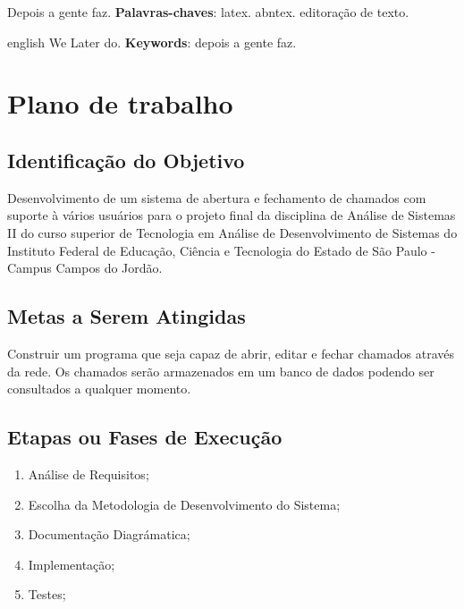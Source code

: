 \documentclass[12pt,openright,a4paper, article]{abntex2}
\begin{document}
\imprimircapa
\imprimirfolhaderosto

\tableofcontents

\newpage

\begin{resumo}
    Depois a gente faz.
    \vspace{\onelineskip}
    \noindent
    \textbf{Palavras-chaves}: latex. abntex. editoração de texto.
\end{resumo}

\begin{resumo}[abstract]
    \begin{otherlanguage*}{english}
        We Later do.
        \vspace{\onelineskip}
        \noindent
        \textbf{Keywords}: depois a gente faz.
    \end{otherlanguage*}
\end{resumo}

\textual

\section {Plano de trabalho}

    \subsection {Identificação do Objetivo}
    Desenvolvimento de um sistema de abertura e fechamento de chamados com suporte à vários usuários para o projeto final da disciplina de Análise de Sistemas II do curso superior de Tecnologia em Análise de Desenvolvimento de Sistemas do Instituto Federal de Educação, Ciência e Tecnologia do Estado de São Paulo - Campus Campos do Jordão.
    
    \subsection {Metas a Serem Atingidas}
        Construir um programa que seja capaz de abrir, editar e fechar chamados através da rede. Os chamados serão armazenados em um banco de dados podendo ser consultados a qualquer momento.
    
    \subsection {Etapas ou Fases de Execução}
        \begin{enumerate}
            \item Análise de Requisitos;
            \item Escolha da Metodologia de Desenvolvimento do Sistema;
            \item Documentação Diagrámatica;
            \item Implementação;
            \item Testes;
        \end{enumerate}
    
\end{document}

